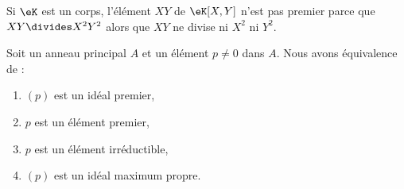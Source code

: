 \begin{example}
    Si \( \eK\) est un corps, l'élément \( XY\) de \( \eK[X,Y]\) n'est pas premier parce que \( XY\divides X^2Y^2\) alors que \( XY\) ne divise ni \( X^2\) ni \( Y^2\).
\end{example}


\begin{proposition}     \label{PROPooZICGooNmblhl}
    Soit un anneau principal \( A\) et un élément \( p\neq 0\) dans \( A\). Nous avons équivalence de :
    \begin{enumerate}
        \item   \label{ITEMooBTEAooWlFUTX}
            \( (p)\) est un idéal premier,
        \item   \label{ITEMooKQRMooBNPDMX}
            \( p\) est un élément premier,
        \item   \label{ITEMooZYYJooCWiBhL}
            \( p\) est un élément irréductible,
        \item   \label{ITEMooHPAIooYoQzqD}
            \( (p)\) est un idéal maximum propre.
    \end{enumerate}
\end{proposition}

